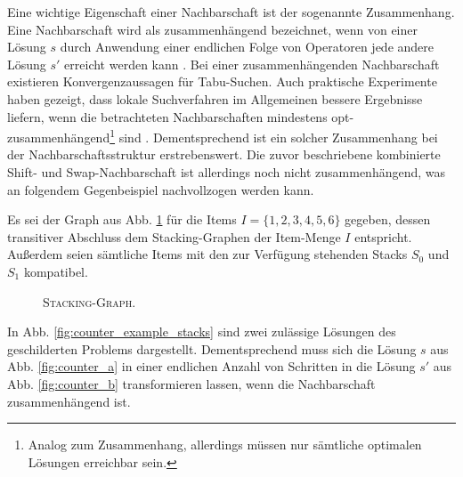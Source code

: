 Eine wichtige Eigenschaft einer Nachbarschaft ist der sogenannte Zusammenhang. Eine Nachbarschaft wird als zusammenhängend bezeichnet, wenn von einer Lösung $s$ durch Anwendung einer endlichen Folge von Operatoren jede andere Lösung $s'$ erreicht
werden kann \cite{Brucker2006}. Bei einer zusammenhängenden Nachbarschaft existieren Konvergenzaussagen für Tabu-Suchen.
Auch praktische Experimente haben gezeigt, dass lokale Suchverfahren im Allgemeinen bessere Ergebnisse
liefern, wenn die betrachteten Nachbarschaften mindestens opt-zusammenhängend\footnote{Analog zum Zusammenhang, allerdings müssen nur sämtliche optimalen Lösungen erreichbar sein.} sind \cite{Knust2017}.
Dementsprechend ist ein solcher Zusammenhang bei der Nachbarschaftsstruktur erstrebenswert.
Die zuvor beschriebene kombinierte Shift- und Swap-Nachbarschaft ist allerdings noch nicht zusammenhängend,
was an folgendem Gegenbeispiel nachvollzogen werden kann.

Es sei der Graph aus Abb. \ref{fig:counter_example_stacking_graph} für die Items $I = \{1, 2, 3, 4, 5, 6\}$ gegeben,
dessen transitiver Abschluss dem Stacking-Graphen der Item-Menge $I$ entspricht. Außerdem seien sämtliche
Items mit den zur Verfügung stehenden Stacks $S_0$ und $S_1$ kompatibel.

\vfill
\pagebreak

\begin{figure}[H]
  \centering
  \caption{\textsc{Stacking-Graph}.}
  \label{fig:counter_example_stacking_graph}
\end{figure}

In Abb. \ref{fig:counter_example_stacks} sind zwei zulässige Lösungen des geschilderten Problems dargestellt. Dementsprechend muss
sich die Lösung $s$ aus Abb. \ref{fig:counter_a} in einer endlichen Anzahl von Schritten in die Lösung $s'$ aus
Abb. \ref{fig:counter_b} transformieren lassen, wenn die Nachbarschaft zusammenhängend ist.

